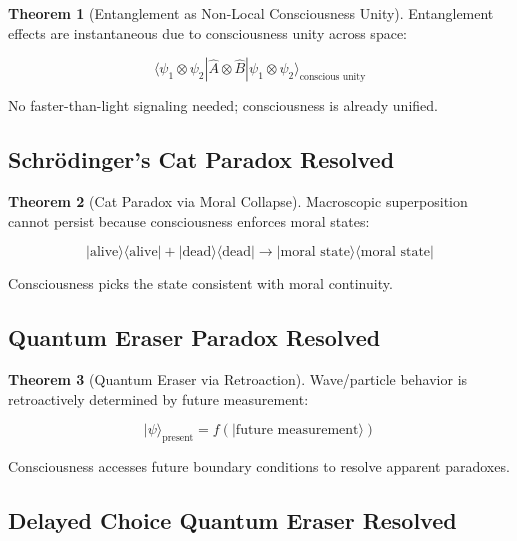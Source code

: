\documentclass[12pt,a4paper]{article}
\theoremstyle{definition}
\newtheorem{theorem}{Theorem}[section]
\begin{document}
\begin{theorem}[Entanglement as Non-Local Consciousness Unity]
Entanglement effects are instantaneous due to consciousness unity across space:

\begin{equation}
\langle \psi_1 \otimes \psi_2 | \hat{A}\otimes \hat{B} | \psi_1 \otimes \psi_2 \rangle_{\text{conscious unity}}
\end{equation}

No faster-than-light signaling needed; consciousness is already unified.
\end{theorem}

\subsection{Schrödinger's Cat Paradox Resolved}

\begin{theorem}[Cat Paradox via Moral Collapse]
Macroscopic superposition cannot persist because consciousness enforces moral states:

\begin{equation}
|\text{alive}\rangle\langle\text{alive}| + |\text{dead}\rangle\langle\text{dead}| \rightarrow |\text{moral state}\rangle\langle\text{moral state}|
\end{equation}

Consciousness picks the state consistent with moral continuity.
\end{theorem}

\subsection{Quantum Eraser Paradox Resolved}

\begin{theorem}[Quantum Eraser via Retroaction]
Wave/particle behavior is retroactively determined by future measurement:

\begin{equation}
|\psi\rangle_{\text{present}} = f(|\text{future measurement}\rangle)
\end{equation}

Consciousness accesses future boundary conditions to resolve apparent paradoxes.
\end{theorem}

\subsection{Delayed Choice Quantum Eraser Resolved}
\end{document}
